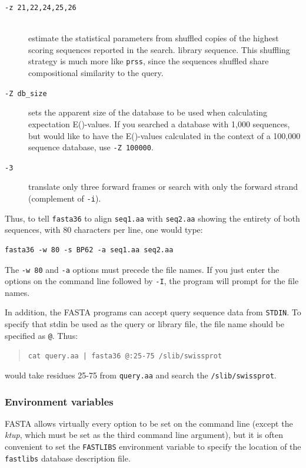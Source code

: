 \documentclass[11pt]{article}
\begin{document}
\begin{description}
\item[\texttt{-z 21,22,24,25,26}]\hfill\\
estimate the statistical parameters from shuffled copies of the
highest scoring sequences reported in the search.
library sequence. This shuffling strategy is much more like
\texttt{prss}, since the sequences shuffled share compositional
similarity to the query.
\item[\texttt{-Z db\_size}]
sets the apparent size of the database to be used when calculating
expectation E()-values.  If you searched a database with 1,000
sequences, but would like to have the E()-values calculated in the
context of a 100,000 sequence database, use \texttt{-Z 100000}.
\item[\texttt{-3}]
translate only three forward frames or search with only the forward
strand (complement of \texttt{-i}).
\end{description}

Thus, to tell \texttt{fasta36} to align \texttt{seq1.aa} with \texttt{seq2.aa} showing the entirety of both sequences, with 80 characters per line, one would type:
\begin{verbatim}
fasta36 -w 80 -s BP62 -a seq1.aa seq2.aa
\end{verbatim}
The \texttt{-w 80} and \texttt{-a} options must precede the file
names.  If you just enter the options on the command line followed by
\texttt{-I}, the program will prompt for the file names.

In addition, the FASTA programs can accept query sequence data from
\texttt{STDIN}.  To specify that stdin be used as the query or library
file, the file name should be specified as \texttt{@}.  Thus:
\begin{quote}
\texttt{cat query.aa | fasta36 @:25-75 /slib/swissprot }
\end{quote}
would take residues 25-75 from \texttt{query.aa} and search the
\texttt{/slib/swissprot}.

\subsubsection{Environment variables}

FASTA allows virtually every option to be set on the command line
(except the \emph{ktup}, which must be set as the third command line
argument), but it is often convenient to set the \texttt{FASTLIBS}
environment variable to specify the location of the \texttt{fastlibs}
database description file.
\end{document}
